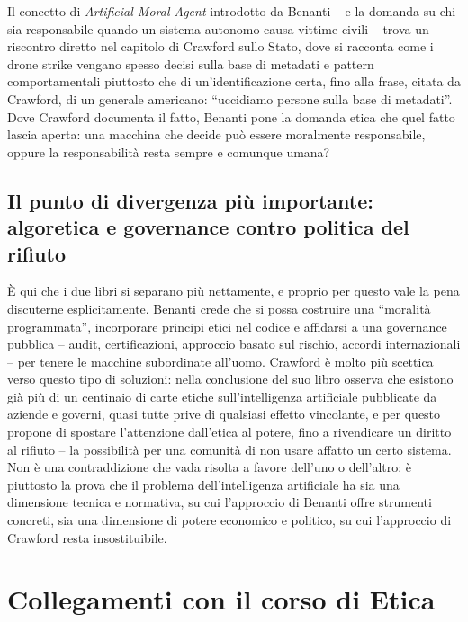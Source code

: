 \documentclass[a4paper,11pt]{article}
\begin{document}
Il concetto di \emph{Artificial Moral Agent} introdotto da Benanti -- e la domanda su chi sia responsabile quando un sistema autonomo causa vittime civili -- trova un riscontro diretto nel capitolo di Crawford sullo Stato, dove si racconta come i drone strike vengano spesso decisi sulla base di metadati e pattern comportamentali piuttosto che di un'identificazione certa, fino alla frase, citata da Crawford, di un generale americano: ``uccidiamo persone sulla base di metadati''. Dove Crawford documenta il fatto, Benanti pone la domanda etica che quel fatto lascia aperta: una macchina che decide può essere moralmente responsabile, oppure la responsabilità resta sempre e comunque umana?

\subsection{Il punto di divergenza più importante: algoretica e governance contro politica del rifiuto}

È qui che i due libri si separano più nettamente, e proprio per questo vale la pena discuterne esplicitamente. Benanti crede che si possa costruire una ``moralità programmata'', incorporare principi etici nel codice e affidarsi a una governance pubblica -- audit, certificazioni, approccio basato sul rischio, accordi internazionali -- per tenere le macchine subordinate all'uomo. Crawford è molto più scettica verso questo tipo di soluzioni: nella conclusione del suo libro osserva che esistono già più di un centinaio di carte etiche sull'intelligenza artificiale pubblicate da aziende e governi, quasi tutte prive di qualsiasi effetto vincolante, e per questo propone di spostare l'attenzione dall'etica al potere, fino a rivendicare un diritto al rifiuto -- la possibilità per una comunità di non usare affatto un certo sistema. Non è una contraddizione che vada risolta a favore dell'uno o dell'altro: è piuttosto la prova che il problema dell'intelligenza artificiale ha sia una dimensione tecnica e normativa, su cui l'approccio di Benanti offre strumenti concreti, sia una dimensione di potere economico e politico, su cui l'approccio di Crawford resta insostituibile.

\section{Collegamenti con il corso di Etica}
\end{document}
